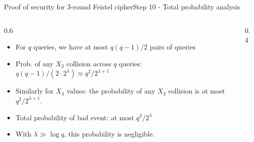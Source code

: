 \documentclass[aspectratio=169, lualatex, handout]{beamer}
\begin{document}
\begin{frame}{Proof of security for 3-round Feistel cipher}{Step 10 - Total probability analysis}
	\begin{columns}[c]
		\begin{column}{0.6\textwidth}
			\begin{itemize}[<+->]
				\item For $q$ queries, we have at most $q(q-1)/2$ pairs of queries
				\item Prob. of any $X_2$ collision across $q$ queries:
				      $q(q-1)/(2 \cdot 2^{\lambda}) \approx q^2/2^{\lambda+1}$
				\item Similarly for $X_3$ values: the probability of any $X_3$ collision is at most $q^2/2^{\lambda+1}$.
				\item Total probability of bad event: at most $q^2/2^{\lambda}$
				\item With $\lambda \gg \log q$, this probability is negligible.
			\end{itemize}
		\end{column}
		\begin{column}{0.4\textwidth}
			\vspace{-1.5cm}
			\begin{center}
			\end{center}
		\end{column}
	\end{columns}
\end{frame}
\end{document}
